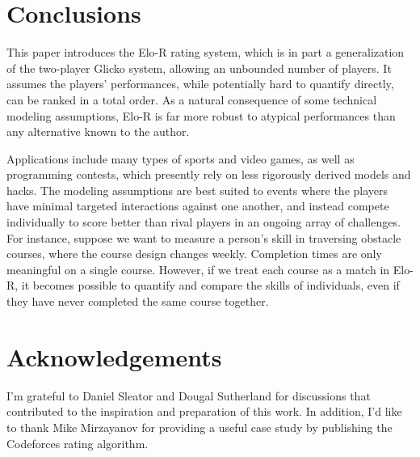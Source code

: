 \documentclass{article}
\begin{document}
\section{Conclusions}

This paper introduces the Elo-R rating system, which is in part a generalization of the two-player Glicko system, allowing an unbounded number of players. It assumes the players' performances, while potentially hard to quantify directly, can be ranked in a total order. As a natural consequence of some technical modeling assumptions, Elo-R is far more robust to atypical performances than any alternative known to the author.

Applications include many types of sports and video games, as well as programming contests, which presently rely on less rigorously derived models and hacks. The modeling assumptions are best suited to events where the players have minimal targeted interactions against one another, and instead compete individually to score better than rival players in an ongoing array of challenges. For instance, suppose we want to measure a person's skill in traversing obstacle courses, where the course design changes weekly. Completion times are only meaningful on a single course. However, if we treat each course as a match in Elo-R, it becomes possible to quantify and compare the skills of individuals, even if they have never completed the same course together.

\section*{Acknowledgements}

I'm grateful to Daniel Sleator and Dougal Sutherland for discussions that contributed to the inspiration and preparation of this work. In addition, I'd like to thank Mike Mirzayanov for providing a useful case study by publishing the Codeforces rating algorithm.



\end{document}
